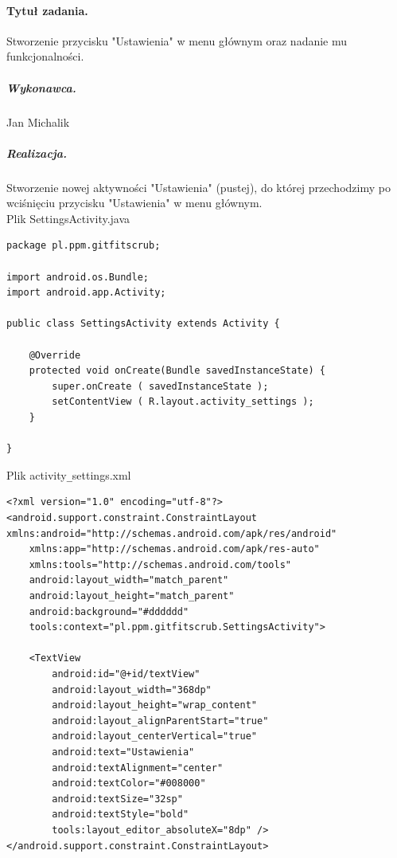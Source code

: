 \documentclass[a4paper]{article}
\begin{document}
\paragraph{Tytuł zadania.} Stworzenie przycisku "Ustawienia" w menu głównym oraz nadanie mu funkcjonalności.
\subparagraph{Wykonawca.} Jan Michalik
\subparagraph{Realizacja.} Stworzenie nowej aktywności "Ustawienia" (pustej), do której przechodzimy po wciśnięciu przycisku "Ustawienia" w menu głównym.\\
Plik SettingsActivity.java
 \begin{lstlisting}[style=java]
 package pl.ppm.gitfitscrub;

import android.os.Bundle;
import android.app.Activity;

public class SettingsActivity extends Activity {

    @Override
    protected void onCreate(Bundle savedInstanceState) {
        super.onCreate ( savedInstanceState );
        setContentView ( R.layout.activity_settings );
    }

}
 \end{lstlisting}
 Plik activity\verb|_|settings.xml
 \begin{lstlisting}[style=xml]
 <?xml version="1.0" encoding="utf-8"?>
<android.support.constraint.ConstraintLayout xmlns:android="http://schemas.android.com/apk/res/android"
    xmlns:app="http://schemas.android.com/apk/res-auto"
    xmlns:tools="http://schemas.android.com/tools"
    android:layout_width="match_parent"
    android:layout_height="match_parent"
    android:background="#dddddd"
    tools:context="pl.ppm.gitfitscrub.SettingsActivity">

    <TextView
        android:id="@+id/textView"
        android:layout_width="368dp"
        android:layout_height="wrap_content"
        android:layout_alignParentStart="true"
        android:layout_centerVertical="true"
        android:text="Ustawienia"
        android:textAlignment="center"
        android:textColor="#008000"
        android:textSize="32sp"
        android:textStyle="bold"
        tools:layout_editor_absoluteX="8dp" />
</android.support.constraint.ConstraintLayout>

\end{lstlisting}
\end{document}
